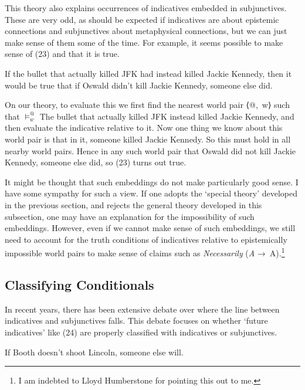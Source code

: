 \documentclass[
  11pt,
  letterpaper,
  DIV=11,
  numbers=noendperiod,
  twoside]{scrartcl}
\providecommand{\tightlist}{%
  \setlength{\itemsep}{0pt}\setlength{\parskip}{0pt}}
\begin{document}
This theory also explains occurrences of indicatives embedded in
subjunctives. These are very odd, as should be expected if indicatives
are about epistemic connections and subjunctives about metaphysical
connections, but we can just make sense of them some of the time. For
example, it seems possible to make sense of (23) and that it is true.

\begin{description}
\tightlist
\item[(23)]
If the bullet that actually killed JFK had instead killed Jackie
Kennedy, then it would be true that if Oswald didn't kill Jackie
Kennedy, someone else did.
\end{description}

On our theory, to evaluate this we first find the nearest world pair
⟨@,~w⟩ such that \(\vDash_w^@\) The bullet that actually killed JFK
instead killed Jackie Kennedy, and then evaluate the indicative relative
to it. Now one thing we know about this world pair is that in it,
someone killed Jackie Kennedy. So this must hold in all nearby world
pairs. Hence in any such world pair that Oswald did not kill Jackie
Kennedy, someone else did, so (23) turns out true.

It might be thought that such embeddings do not make particularly good
sense. I have some sympathy for such a view. If one adopts the `special
theory' developed in the previous section, and rejects the general
theory developed in this subsection, one may have an explanation for the
impossibility of such embeddings. However, even if we cannot make sense
of such embeddings, we still need to account for the truth conditions of
indicatives relative to epistemically impossible world pairs to make
sense of claims such as \emph{Necessarily} (\emph{A} →~A).\footnote{I am
  indebted to Lloyd Humberstone for pointing this out to me.}

\subsection{Classifying Conditionals}\label{classifying-conditionals}

In recent years, there has been extensive debate over where the line
between indicatives and subjunctives falls. This debate focuses on
whether `future indicatives' like (24) are properly classified with
indicatives or subjunctives.

\begin{description}
\tightlist
\item[(24)]
If Booth doesn't shoot Lincoln, someone else will.
\end{description}
\end{document}
